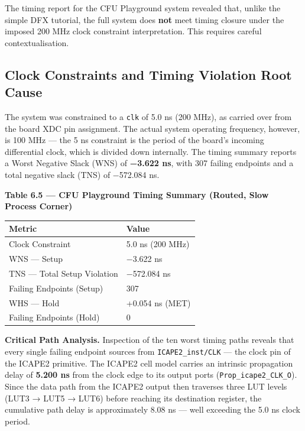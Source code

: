 The timing report for the CFU Playground system revealed that, unlike the simple DFX tutorial, the full system does \textbf{not} meet timing closure under the imposed 200 MHz clock constraint interpretation. This requires careful contextualisation.

\subsection{Clock Constraints and Timing Violation Root Cause}

The system was constrained to a \texttt{clk} of 5.0 ns (200 MHz), as carried over from the board XDC pin assignment. The actual system operating frequency, however, is 100 MHz — the 5 ns constraint is the period of the board's incoming differential clock, which is divided down internally. The timing summary reports a Worst Negative Slack (WNS) of \textbf{−3.622 ns}, with 307 failing endpoints and a total negative slack (TNS) of −572.084 ns.

\textbf{Table 6.5 — CFU Playground Timing Summary (Routed, Slow Process Corner)}

\begin{table}[htbp]
\centering
\begin{tabularx}{\textwidth}{X X}
\toprule
Metric & Value \\
\midrule
Clock Constraint & 5.0 ns (200 MHz) \\
WNS — Setup & −3.622 ns \\
TNS — Total Setup Violation & −572.084 ns \\
Failing Endpoints (Setup) & 307 \\
WHS — Hold & +0.054 ns (MET) \\
Failing Endpoints (Hold) & 0 \\
\bottomrule
\end{tabularx}
\end{table}

\textbf{Critical Path Analysis.} Inspection of the ten worst timing paths reveals that every single failing endpoint sources from \texttt{ICAPE2\_inst/CLK} — the clock pin of the ICAPE2 primitive. The ICAPE2 cell model carries an intrinsic propagation delay of \textbf{5.200 ns} from the clock edge to its output ports (\texttt{Prop\_icape2\_CLK\_O}). Since the data path from the ICAPE2 output then traverses three LUT levels (LUT3 → LUT5 → LUT6) before reaching its destination register, the cumulative path delay is approximately 8.08 ns — well exceeding the 5.0 ns clock period.

